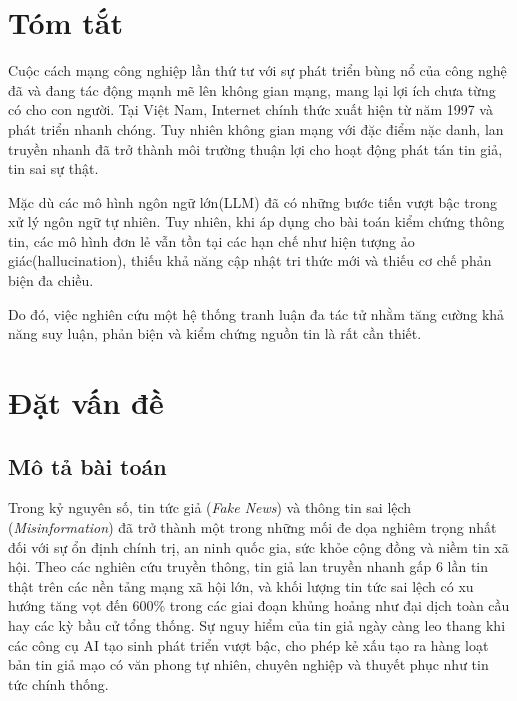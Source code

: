\documentclass[12pt,a4paper]{report}
\begin{document}
\newpage

\chapter*{Tóm tắt}
\setcounter{page}{4}
Cuộc cách mạng công nghiệp lần thứ tư với sự phát triển bùng nổ của công nghệ đã và đang tác động mạnh mẽ lên không gian mạng, mang lại lợi ích chưa từng có cho con người. Tại Việt Nam, Internet chính thức xuất hiện từ năm 1997 và phát triển nhanh chóng. Tuy nhiên không gian mạng với đặc điểm nặc danh, lan truyền nhanh đã trở thành môi trường thuận lợi cho hoạt động phát tán tin giả, tin sai sự thật. 

Mặc dù các mô hình ngôn ngữ lớn(LLM) đã có những bước tiến vượt bậc trong xử lý ngôn ngữ tự nhiên. Tuy nhiên, khi áp dụng cho bài toán kiểm chứng thông tin, các mô hình đơn lẻ vẫn tồn tại các hạn chế như hiện tượng ảo giác(hallucination), thiếu khả năng cập nhật tri thức mới và thiếu cơ chế phản biện đa chiều.

Do đó, việc nghiên cứu một hệ thống tranh luận đa tác tử nhằm tăng cường khả năng suy luận, phản biện và kiểm chứng nguồn tin là rất cần thiết.


\newpage

\tableofcontents
\newpage


\chapter{Đặt vấn đề}
\setcounter{page}{6}

\section{Mô tả bài toán}
Trong kỷ nguyên số, tin tức giả (\textit{Fake News}) và thông tin sai lệch (\textit{Misinformation}) đã trở thành một trong những mối đe dọa nghiêm trọng nhất đối với sự ổn định chính trị, an ninh quốc gia, sức khỏe cộng đồng và niềm tin xã hội. Theo các nghiên cứu truyền thông, tin giả lan truyền nhanh gấp 6 lần tin thật trên các nền tảng mạng xã hội lớn, và khối lượng tin tức sai lệch có xu hướng tăng vọt đến 600\% trong các giai đoạn khủng hoảng như đại dịch toàn cầu hay các kỳ bầu cử tổng thống. Sự nguy hiểm của tin giả ngày càng leo thang khi các công cụ AI tạo sinh phát triển vượt bậc, cho phép kẻ xấu tạo ra hàng loạt bản tin giả mạo có văn phong tự nhiên, chuyên nghiệp và thuyết phục như tin tức chính thống.
\end{document}
